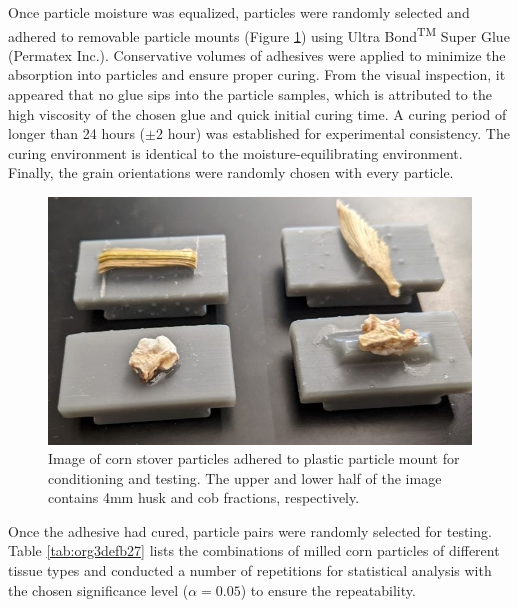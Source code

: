 \documentclass[xcolor=dvipsnames,10pt,hidelinks]{article}
\begin{document}
Once particle moisture was equalized, particles were randomly selected and adhered to removable particle mounts (Figure \ref{fig:org976c022}) using Ultra Bond\textsuperscript{TM} Super Glue (Permatex Inc.).
Conservative volumes of adhesives were applied to minimize the absorption into particles and ensure proper curing.
From the visual inspection, it appeared that no glue sips into the particle samples,
which is attributed to the high viscosity of the chosen glue and quick initial curing time.
A curing period of longer than 24 hours (\(\pm 2\) hour) was established for experimental consistency.
The curing environment is identical to the moisture-equilibrating environment.
Finally, the grain orientations were randomly chosen with every particle.

\begin{figure}[htbp]
\centering
\includegraphics[width=.9\linewidth]{figures/image4.jpg}
\caption{\label{fig:org976c022}Image of corn stover particles adhered to plastic particle mount for conditioning and testing. The upper and lower half of the image contains 4mm husk and cob fractions, respectively.}
\end{figure}

Once the adhesive had cured, particle pairs were randomly selected for testing.
Table \ref{tab:org3defb27} lists the combinations of milled corn particles of different tissue types and conducted a number of repetitions for statistical analysis with the chosen significance level (\(\alpha = 0.05\)) to ensure the repeatability.
\end{document}
